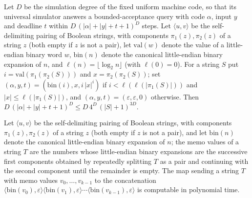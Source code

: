 \begin{theorem}
\label{Complexity.ladner_query_budget}
\leanok
{}
Let $D$ be the simulation degree of the fixed uniform machine code, so that its universal
simulator answers a bounded-acceptance query with code $\alpha$, input $y$ and deadline $t$
within $D\,(|\alpha|+|y|+t+1)^D$ steps. Let $\langle u,v\rangle$ be the self-delimiting pairing of Boolean strings, with components $\pi_1(z),\pi_2(z)$ of a string $z$ (both empty if $z$ is not a pair), let $\mathrm{val}(w)$ denote the value of a little-endian binary word $w$, $\mathrm{bin}(n)$ denote the canonical little-endian binary expansion of $n$, and $\ell(n)=\lfloor\log_2 n\rfloor$ (with $\ell(0)=0$). For a string $S$
put $i=\mathrm{val}(\pi_1(\pi_2(S)))$ and $x=\pi_2(\pi_2(S))$; set
$(\alpha,y,t)=(\mathrm{bin}(i),x,i\,|x|^i)$ if $i<\ell(\ell(|\pi_1(S)|))$ and
$|x|\le\ell(|\pi_1(S)|)$, and $(\alpha,y,t)=(\varepsilon,\varepsilon,0)$ otherwise. Then
$D\,(|\alpha|+|y|+t+1)^D\le D\,4^D\,(|S|+1)^{3D}$.
\end{theorem}

\begin{theorem}
\label{Complexity.ladner_table_FP}
\leanok
{}
Let $\langle u,v\rangle$ be the self-delimiting pairing of Boolean strings, with components $\pi_1(z),\pi_2(z)$ of a string $z$ (both empty if $z$ is not a pair), and let $\mathrm{bin}(n)$ denote the canonical little-endian binary expansion of $n$; the memo values of a string $T$ are the numbers whose little-endian binary expansions are the successive first components obtained by repeatedly splitting $T$ as a pair and continuing with the second component until the remainder is empty. The map sending a string $T$ with memo values
$v_0,\dots,v_{k-1}$ to the concatenation
$\langle\mathrm{bin}(v_0),\varepsilon\rangle\langle\mathrm{bin}(v_1),\varepsilon\rangle\cdots
\langle\mathrm{bin}(v_{k-1}),\varepsilon\rangle$ is computable in polynomial time.
\end{theorem}

